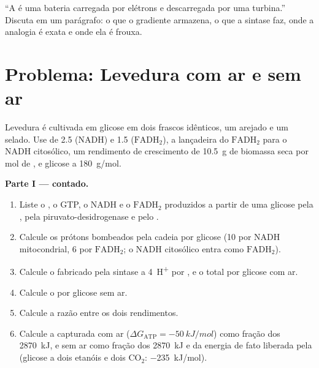 \begin{exercise}[$\star\star\star$]\label{exo:b1:respiration-fermentation:12}
``A  é uma bateria carregada por elétrons e descarregada por
uma turbina.'' Discuta em um parágrafo: o que o gradiente armazena, o
que a sintase faz, onde a analogia é exata e onde ela é frouxa.
\end{exercise}

\section{Problema: Levedura com ar e sem ar}

\begin{problem}
\label{pb:b1:respiration-fermentation:1}
Levedura é cultivada em glicose em dois frascos idênticos, um arejado e
um selado. Use  de 2.5 (NADH) e 1.5 ($\mathrm{FADH_2}$), a
lançadeira do $\mathrm{FADH_2}$ para o NADH citosólico, um rendimento de
crescimento de \qty{10.5}{g} de biomassa seca por mol de , e glicose
a \qty{180}{g/mol}.

\medskip
\noindent\textbf{Parte I ---  contado.}
\begin{enumerate}
  \item Liste o , o GTP, o NADH e o $\mathrm{FADH_2}$ produzidos a
        partir de uma glicose pela , pela
        piruvato-desidrogenase e pelo .
  \item Calcule os prótons bombeados pela cadeia por glicose (10 por
        NADH mitocondrial, 6 por $\mathrm{FADH_2}$; o NADH citosólico
        entra como $\mathrm{FADH_2}$).
  \item Calcule o  fabricado pela sintase a \qty{4}{H^+} por , e o
         total por glicose com ar.
  \item Calcule o  por glicose sem ar.
  \item Calcule a razão entre os dois rendimentos.
  \item Calcule a  capturada com ar ($\Delta G_{\text{ATP}}
        = \qty{-50}{kJ/mol}$) como fração dos \qty{2870}{kJ}, e sem ar
        como fração dos \qty{2870}{kJ} e da energia de fato liberada
        pela  (glicose a dois etanóis e dois
        $\mathrm{CO_2}$: \qty{-235}{kJ/mol}).
\end{enumerate}


\end{problem}
